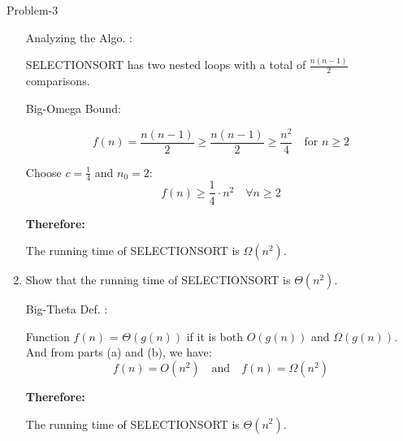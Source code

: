 \begin{problem}{}{Problem-3}
\begin{enumerate}[label=(\alph*)]
		Analyzing the Algo. :
		
		 SELECTIONSORT has two nested loops with a total of \( \frac{n(n-1)}{2} \) comparisons.
		
		Big-Omega Bound:
		
		\[
		f(n) = \frac{n(n-1)}{2} \geq \frac{n(n-1)}{2} \geq \frac{n^2}{4} \quad \text{for } n \geq 2
		\]

		
		Choose \( c = \frac{1}{4} \) and \( n_0 = 2 \):
		\[
		f(n) \geq \frac{1}{4} \cdot n^2 \quad \forall n \geq 2
		\]
		
		\textbf{Therefore:}
		
		The running time of SELECTIONSORT is \( \Omega(n^2) \). 
		
		\item Show that the running time of SELECTIONSORT is \( \Theta(n^2) \).
		
		Big-Theta Def. :
		
		Function \( f(n) \) = \( \Theta(g(n)) \) if it is both \( O(g(n)) \) and \( \Omega(g(n)) \). And from parts (a) and (b), we have:
		\[
		f(n) = O(n^2) \quad \text{and} \quad f(n) = \Omega(n^2)
		\]
		
		\textbf{Therefore:}
		
		The running time of SELECTIONSORT is \( \Theta(n^2) \). 
	\end{enumerate}
\end{problem}

